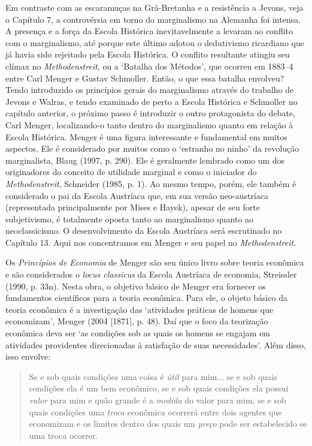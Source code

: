\documentclass[12pt]{article}
\begin{document}
Em contraste com as escaramuças na Grã-Bretanha e a resistência a Jevons, veja o Capítulo 7, a controvérsia em torno do marginalismo na Alemanha foi intensa. A presença e a força da Escola Histórica inevitavelmente a levaram ao conflito com o marginalismo, até porque este último adotou o dedutivismo ricardiano que já havia sido rejeitado pela Escola Histórica. O conflito resultante atingiu seu clímax no \textit{Methodenstreit}, ou a ‘Batalha dos Métodos’, que ocorreu em 1883–4 entre Carl Menger e Gustav Schmoller. Então, o que essa batalha envolveu? Tendo introduzido os princípios gerais do marginalismo através do trabalho de Jevons e Walras, e tendo examinado de perto a Escola Histórica e Schmoller no capítulo anterior, o próximo passo é introduzir o outro protagonista do debate, Carl Menger, localizando-o tanto dentro do marginalismo quanto em relação à Escola Histórica. Menger é uma figura interessante e fundamental em muitos aspectos. Ele é considerado por muitos como o ‘estranho no ninho’ da revolução marginalista, Blaug (1997, p. 290). Ele é geralmente lembrado como um dos originadores do conceito de utilidade marginal e como o iniciador do \textit{Methodenstreit}, Schneider (1985, p. 1). Ao mesmo tempo, porém, ele também é considerado o pai da Escola Austríaca que, em sua versão neo-austríaca (representada principalmente por Mises e Hayek), apesar de seu forte subjetivismo, é totalmente oposta tanto ao marginalismo quanto ao neoclassicismo. O desenvolvimento da Escola Austríaca será escrutinado no Capítulo 13. Aqui nos concentramos em Menger e seu papel no \textit{Methodenstreit}.

Os \textit{Princípios de Economia} de Menger são seu único livro sobre teoria econômica e são considerados o \textit{locus classicus} da Escola Austríaca de economia, Streissler (1990, p. 33n). Nesta obra, o objetivo básico de Menger era fornecer os fundamentos científicos para a teoria econômica. Para ele, o objeto básico da teoria econômica é a investigação das ‘atividades práticas de homens que economizam’, Menger (2004 [1871], p. 48). Daí que o foco da teorização econômica deva ser ‘as condições sob as quais os homens se engajam em atividades providentes direcionadas à satisfação de suas necessidades’. Além disso, isso envolve:

\begin{quote}
Se e sob quais condições uma coisa é \textit{útil} para mim... se e sob quais condições ela é um bem econômico, se e sob quais condições ela possui \textit{valor} para mim e quão grande é a \textit{medida} do valor para mim, se e sob quais condições uma \textit{troca} econômica ocorrerá entre dois agentes que economizam e os limites dentro dos quais um \textit{preço} pode ser estabelecido se uma troca ocorrer.
\end{quote}
\end{document}
